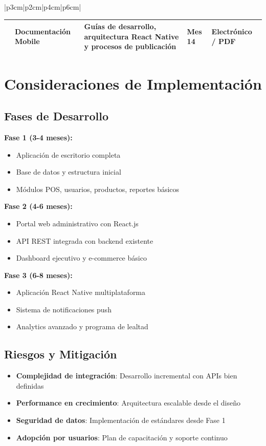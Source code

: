 \documentclass[12pt,letterpaper]{article}
\begin{document}
\begin{longtable}{|p{3cm}|p{2cm}|p{4cm}|p{6cm}|}
\begin{longtable}{|>{\centering}p{1cm}|p{4cm}|p{6cm}|>{\centering}p{2.5cm}|>{\centering\arraybackslash}p{2.5cm}|}
16 & Documentación Mobile & Guías de desarrollo, arquitectura React Native y procesos de publicación & Mes 14 & Electrónico / PDF \\
\hline
\end{longtable}

\section{Consideraciones de Implementación}

\subsection{Fases de Desarrollo}
\textbf{Fase 1 (3-4 meses):}
\begin{itemize}
    \item Aplicación de escritorio completa
    \item Base de datos y estructura inicial
    \item Módulos POS, usuarios, productos, reportes básicos
\end{itemize}

\textbf{Fase 2 (4-6 meses):}
\begin{itemize}
    \item Portal web administrativo con React.js
    \item API REST integrada con backend existente
    \item Dashboard ejecutivo y e-commerce básico
\end{itemize}

\textbf{Fase 3 (6-8 meses):}
\begin{itemize}
    \item Aplicación React Native multiplataforma
    \item Sistema de notificaciones push
    \item Analytics avanzado y programa de lealtad
\end{itemize}

\subsection{Riesgos y Mitigación}
\begin{itemize}
    \item \textbf{Complejidad de integración}: Desarrollo incremental con APIs bien definidas
    \item \textbf{Performance en crecimiento}: Arquitectura escalable desde el diseño
    \item \textbf{Seguridad de datos}: Implementación de estándares desde Fase 1
    \item \textbf{Adopción por usuarios}: Plan de capacitación y soporte continuo
\end{itemize}


\end{longtable}
\end{document}
